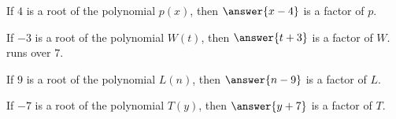\documentclass{ximera}
\author{Lee Wayand}
\begin{document}
\begin{exercise}








\begin{question}



If $4$ is a root of the polynomial $p(x)$, then $\answer{x-4}$ is a factor of $p$.




\end{question}











\begin{question}



If $-3$ is a root of the polynomial $W(t)$, then $\answer{t+3}$ is a factor of $W$.
 runs over $7$.




\end{question}












\begin{question}


If $9$ is a root of the polynomial $L(n)$, then $\answer{n-9}$ is a factor of $L$.





\end{question}












\begin{question}


If $-7$ is a root of the polynomial $T(y)$, then $\answer{y+7}$ is a factor of $T$.





\end{question}








\end{exercise}
\end{document}
